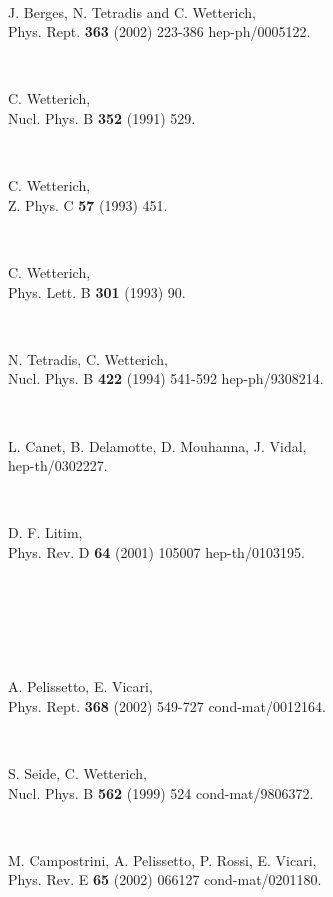 \documentclass[a4paper,aps,prl,twocolumn,groupedaddress]{revtex4}
\begin{document}
\begin{thebibliography}{10}

~

J. Berges, N. Tetradis and C. Wetterich,\\
Phys. Rept. {\bf 363} (2002) 223-386 \myHighlight{$[$}\coordHE{}hep-ph/0005122\myHighlight{$]$}\coordHE{}.

~

C. Wetterich,\\
Nucl. Phys. B {\bf 352} (1991) 529.

~

C. Wetterich,\\
Z. Phys. C {\bf 57} (1993) 451.

~

C. Wetterich,\\
Phys. Lett. B {\bf 301} (1993) 90.

~

N. Tetradis, C. Wetterich,\\
Nucl. Phys. B {\bf 422} (1994) 541-592 \myHighlight{$[$}\coordHE{}hep-ph/9308214\myHighlight{$]$}\coordHE{}.

~

L. Canet, B. Delamotte, D. Mouhanna, J. Vidal,\\
\myHighlight{$[$}\coordHE{}hep-th/0302227\myHighlight{$]$}\coordHE{}.

~

D. F. Litim,\\
Phys. Rev. D {\bf 64} (2001) 105007 \myHighlight{$[$}\coordHE{}hep-th/0103195\myHighlight{$]$}\coordHE{}.

~

~

~

A. Pelissetto, E. Vicari,\\
Phys. Rept. {\bf 368} (2002) 549-727 \myHighlight{$[$}\coordHE{}cond-mat/0012164\myHighlight{$]$}\coordHE{}.

~

S. Seide, C. Wetterich,\\
Nucl. Phys. B {\bf 562} (1999) 524 \myHighlight{$[$}\coordHE{}cond-mat/9806372\myHighlight{$]$}\coordHE{}.

~

M. Campostrini, A. Pelissetto, P. Rossi, E. Vicari,\\
Phys. Rev. E {\bf 65} (2002) 066127 \myHighlight{$[$}\coordHE{}cond-mat/0201180\myHighlight{$]$}\coordHE{}.


\end{thebibliography}
\end{document}
